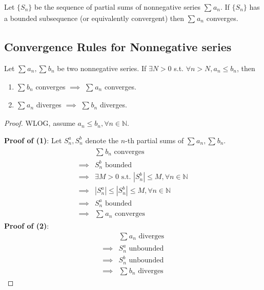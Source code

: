 \begin{corollary}
    Let $\{ S_n \} $ be the sequence of 
    partial sums of nonnegative series $\sum\limits_{}^{} a_n $.
    If $\{ S_n \} $ has a bounded subsequence (or equivalently convergent)
    then $\sum\limits_{}^{} a_n $ converges.
\end{corollary}

\subsection{Convergence Rules for Nonnegative series}

\begin{theorem}
    \label{thm:nonnegative-series-3}
    Let $\sum\limits_{}^{} a_n, \sum\limits_{}^{} b_n$ be 
    two nonnegative series. If $\exists N > 0$ s.t. 
    $\forall n > N, a_n \leq b_n$, then
    \begin{enumerate}
        \item $\sum\limits_{}^{} b_n$ converges $\implies$ $\sum\limits_{}^{} a_n$ converges.
        \item $\sum\limits_{}^{} a_n$ diverges $\implies$ $\sum\limits_{}^{} b_n$ diverges.
    \end{enumerate} 
\end{theorem}

\begin{proof}
    WLOG, assume $a_n \leq b_n, \forall n \in \mathbb{N}$. 
    
    \textbf{Proof of (1)}:
    Let $S_n^{a}, S_n^{b}$ denote the $n$-th partial sums of 
    $\sum\limits_{}^{} a_n, \sum\limits_{}^{} b_n$.
    \begin{align*}
        & \sum\limits_{}^{} b_n \text{ converges} \\
        \implies & S_n^{b} \text{ bounded} \\
        \implies & \exists M > 0 \text{ s.t. } |S_n^{b} | \leq M, \forall n \in \mathbb{N} \\
        \implies & |S_n^{a} |\leq \left| S_n^{b} \right|  \leq M, \forall n \in \mathbb{N} \\
        \implies & S_n^{a} \text{ bounded} \\
        \implies & \sum\limits_{}^{} a_n \text{ converges}
    \end{align*}
    \textbf{Proof of (2)}:
    \begin{align*}
        & \sum\limits_{}^{} a_n \text{ diverges} \\
        \implies & S_n^{a} \text{ unbounded} \\
        \implies & S_n^{b} \text{ unbounded} \\
        \implies & \sum\limits_{}^{} b_n \text{ diverges}
    \end{align*}
\end{proof}

